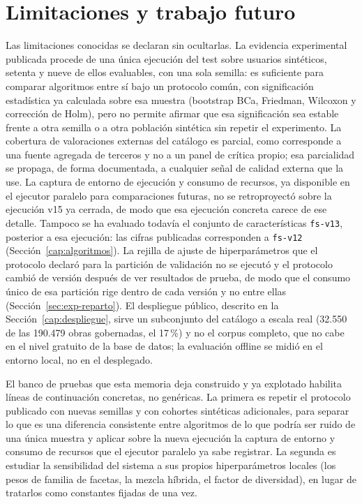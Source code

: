 \section{Limitaciones y trabajo futuro}\label{sec:conc-limitaciones}\label{sec:conc-trabajo-futuro}

Las limitaciones conocidas se declaran sin ocultarlas. La evidencia experimental publicada
procede de una única ejecución del test sobre usuarios sintéticos, setenta y nueve de ellos
evaluables, con una sola semilla: es suficiente para comparar algoritmos entre sí bajo un
protocolo común, con significación estadística ya calculada sobre esa muestra (bootstrap BCa,
Friedman, Wilcoxon y corrección de Holm), pero no permite afirmar que esa significación sea
estable frente a otra semilla o a otra población sintética sin repetir el experimento. La
cobertura de valoraciones externas del catálogo es parcial, como corresponde a una fuente
agregada de terceros y no a un panel de crítica propio; esa parcialidad se propaga, de forma
documentada, a cualquier señal de calidad externa que la use. La captura de entorno de
ejecución y consumo de recursos, ya disponible en el ejecutor paralelo para comparaciones
futuras, no se retroproyectó sobre la ejecución v15 ya cerrada, de modo que esa ejecución
concreta carece de ese detalle. Tampoco se ha evaluado todavía el conjunto de características
\texttt{fs-v13}, posterior a esa ejecución: las cifras publicadas corresponden a \texttt{fs-v12}
(Sección~\ref{cap:algoritmos}). La rejilla de ajuste de hiperparámetros que el protocolo declaró para la partición de
validación no se ejecutó y el protocolo cambió de versión después de ver resultados de prueba, de modo que el consumo
único de esa partición rige dentro de cada versión y no entre ellas (Sección~\ref{sec:exp-reparto}). El despliegue público, descrito en la
Sección~\ref{cap:despliegue}, sirve un subconjunto del catálogo a escala real (32.550 de las 190.479 obras
gobernadas, el 17\,\%) y no el corpus completo, que no cabe en el nivel gratuito de la base de datos; la evaluación
offline se midió en el entorno local, no en el desplegado.

El banco de pruebas que esta memoria deja construido y ya explotado habilita líneas de
continuación concretas, no genéricas. La primera es repetir el protocolo publicado con nuevas
semillas y con cohortes sintéticas adicionales, para separar lo que es una diferencia
consistente entre algoritmos de lo que podría ser ruido de una única muestra y aplicar sobre la nueva ejecución la captura de entorno y consumo de recursos que el
ejecutor paralelo ya sabe registrar. La segunda es estudiar la sensibilidad del sistema a sus propios
hiperparámetros locales (los pesos de familia de facetas, la mezcla híbrida, el factor de
diversidad), en lugar de tratarlos como constantes fijadas de una vez.

